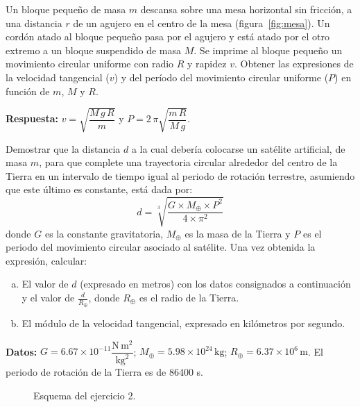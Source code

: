 \documentclass[addpoints]{exam}
\newcommand{\E}[1]{\times 10^{#1}}
\newcommand{\rta}{\textbf{Respuesta: }}
\begin{document}
\begin{questions}
    \question Un bloque pequeño de masa $m$ descansa sobre una mesa horizontal sin fricción, a una distancia $r$ de un agujero en el centro de la mesa (figura~\ref{fig:mesa}). Un cordón atado al bloque pequeño pasa por el agujero y está atado por el otro extremo a un bloque suspendido de masa $M$. Se imprime al bloque pequeño un movimiento circular uniforme con radio $R$ y rapidez $v$. Obtener las expresiones de la velocidad tangencial ($v$) y del período del movimiento circular uniforme ($P$) en función de $m$, $M$ y $R$. \label{ej:mesa}

    \rta $v = \sqrt{\dfrac{M \, g \, R}{m}}$ y $P = 2 \, \pi \sqrt{\dfrac{m \, R}{M \, g}}$.

    \question Demostrar que la distancia $d$ a la cual debería colocarse un satélite artificial, de masa $m$, para que complete una trayectoria circular alrededor del centro de la Tierra en un intervalo de tiempo igual al periodo de rotación terrestre, asumiendo que este último es constante, está dada por: $$d = \sqrt[3]{\frac{G \times M_\oplus \times P^2}{4 \times \pi^2}}$$ donde $G$ es la constante gravitatoria, $M_\oplus$ es la masa de la Tierra y $P$ es el periodo del movimiento circular asociado al satélite. Una vez obtenida la expresión, calcular:
    \begin{enumerate}[a)]
        \item El valor de $d$ (expresado en metros) con los datos consignados a continuación y el valor de $\frac{d}{R_\oplus}$, donde $R_\oplus$ es el radio de la Tierra.
        \item El módulo de la velocidad tangencial, expresado en kilómetros por segundo.
    \end{enumerate}

    \textbf{Datos:} $G = 6.67 \E{-11} \dfrac{\text{N} \, \text{m}^2}{\text{kg}^2}$; $M_\oplus = 5.98 \E{24} \, \text{kg}$; $R_\oplus = 6.37 \E{6} \, \text{m}$. El periodo de rotación de la Tierra es de 86400 s.

    \begin{figure}[ht]
        \centering
        \caption{Esquema del ejercicio 2.}
        \label{fig:orbita_sat}
    \end{figure}


\end{questions}
\end{document}
